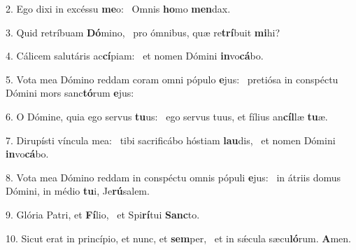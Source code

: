 2. Ego dixi in excéssu \textbf{me}o: \ast\  Omnis \textbf{ho}mo \textbf{men}dax.\

3. Quid retríbuam \textbf{Dó}mino, \ast\  pro ómnibus, quæ re\textbf{trí}buit \textbf{mi}hi?\

4. Cálicem salutáris ac\textbf{cí}piam: \ast\  et nomen Dómini \textbf{in}vo\textbf{cá}bo.\

5. Vota mea Dómino reddam coram omni pópulo \textbf{e}jus: \ast\  pretiósa in conspéctu Dómini mors sanc\textbf{tó}rum \textbf{e}jus:\

6. O Dómine, quia ego servus \textbf{tu}us: \ast\  ego servus tuus, et fílius an\textbf{cíl}læ \textbf{tu}æ.\

7. Dirupísti víncula mea: \dag\  tibi sacrificábo hóstiam \textbf{lau}dis, \ast\  et nomen Dómini \textbf{in}vo\textbf{cá}bo.\

8. Vota mea Dómino reddam in conspéctu omnis pópuli \textbf{e}jus: \ast\  in átriis domus Dómini, in médio \textbf{tu}i, Je\textbf{rú}salem.\

9. Glória Patri, et \textbf{Fí}lio, \ast\  et Spi\textbf{rí}tui \textbf{Sanc}to.\

10. Sicut erat in princípio, et nunc, et \textbf{sem}per, \ast\  et in sǽcula sæcu\textbf{ló}rum. \textbf{A}men.\

